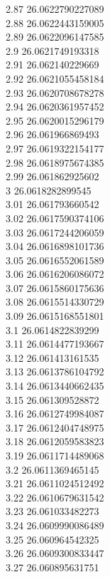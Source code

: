 {2.87	26.0622790227089\\
2.88	26.0622443159005\\
2.89	26.0622096147585\\
2.9	26.0621749193318\\
2.91	26.062140229669\\
2.92	26.0621055458184\\
2.93	26.0620708678278\\
2.94	26.0620361957452\\
2.95	26.0620015296179\\
2.96	26.061966869493\\
2.97	26.0619322154177\\
2.98	26.0618975674385\\
2.99	26.061862925602\\
3	26.0618282899545\\
3.01	26.061793660542\\
3.02	26.0617590374106\\
3.03	26.0617244206059\\
3.04	26.0616898101736\\
3.05	26.0616552061589\\
3.06	26.0616206086072\\
3.07	26.0615860175636\\
3.08	26.0615514330729\\
3.09	26.0615168551801\\
3.1	26.0614822839299\\
3.11	26.0614477193667\\
3.12	26.061413161535\\
3.13	26.0613786104792\\
3.14	26.0613440662435\\
3.15	26.061309528872\\
3.16	26.0612749984087\\
3.17	26.0612404748975\\
3.18	26.0612059583823\\
3.19	26.0611714489068\\
3.2	26.0611369465145\\
3.21	26.0611024512492\\
3.22	26.0610679631542\\
3.23	26.061033482273\\
3.24	26.0609990086489\\
3.25	26.060964542325\\
3.26	26.0609300833447\\
3.27	26.060895631751\\
}
